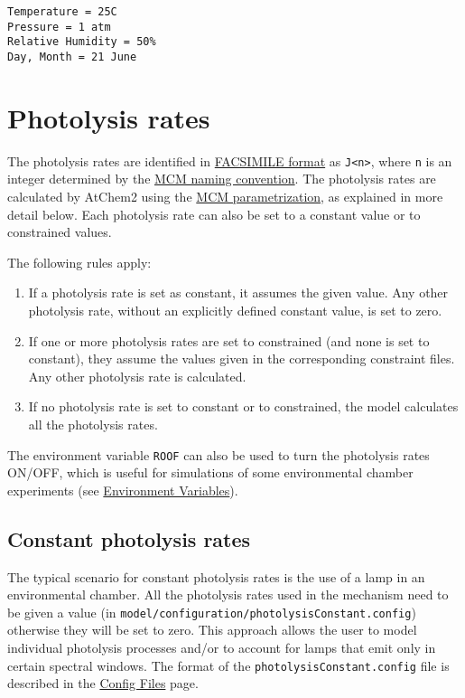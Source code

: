 \begin{verbatim}
Temperature = 25C
Pressure = 1 atm
Relative Humidity = 50%
Day, Month = 21 June
\end{verbatim}

\section{Photolysis rates} \label{sec:photolysis}

The photolysis rates are identified in
\hyperref[sec:mechanism]{FACSIMILE format} as
\texttt{J\textless{}n\textgreater{}}, where \texttt{n} is an integer
determined by the
\href{http://mcm.leeds.ac.uk/MCMv3.3.1/parameters/photolysis.htt}{MCM
  naming convention}. The photolysis rates are calculated by AtChem2
using the
\href{http://mcm.leeds.ac.uk/MCM/parameters/photolysis_param.htt}{MCM
  parametrization}, as explained in more detail below. Each photolysis
rate can also be set to a constant value or to constrained values.

The following rules apply:

\begin{enumerate}
\item If a photolysis rate is set as constant, it assumes the given
  value.  Any other photolysis rate, without an explicitly defined
  constant value, is set to zero.
\item If one or more photolysis rates are set to constrained (and none
  is set to constant), they assume the values given in the
  corresponding constraint files. Any other photolysis rate is
  calculated.
\item If no photolysis rate is set to constant or to constrained, the
  model calculates all the photolysis rates.
\end{enumerate}

The environment variable \texttt{ROOF} can also be used to turn the
photolysis rates ON/OFF, which is useful for simulations of some
environmental chamber experiments (see
\hyperref[sec:envvar]{Environment Variables}).

\subsection{Constant photolysis
  rates} \label{subsec:constant-photolysis-rates}

The typical scenario for constant photolysis rates is the use of a
lamp in an environmental chamber. All the photolysis rates used in the
mechanism need to be given a value (in
\texttt{model/configuration/photolysisConstant.config}) otherwise they
will be set to zero. This approach allows the user to model individual
photolysis processes and/or to account for lamps that emit only in
certain spectral windows. The format of the
\texttt{photolysisConstant.config} file is described in the
\hyperref[sec:config]{Config Files} page.

